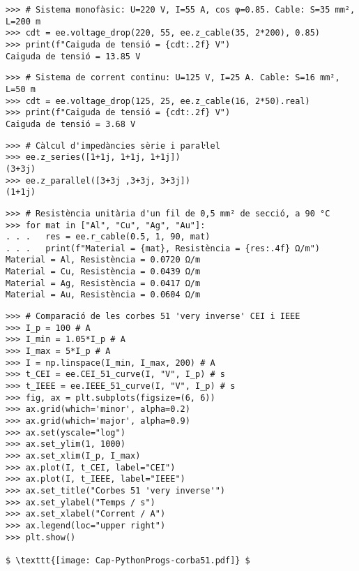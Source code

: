 \begin{lstlisting}
>>> # Sistema monofàsic: U=220 V, I=55 A, cos φ=0.85. Cable: S=35 mm², L=200 m
>>> cdt = ee.voltage_drop(220, 55, ee.z_cable(35, 2*200), 0.85)
>>> print(f"Caiguda de tensió = {cdt:.2f} V")
Caiguda de tensió = 13.85 V
\end{lstlisting}

\begin{lstlisting}
>>> # Sistema de corrent continu: U=125 V, I=25 A. Cable: S=16 mm², L=50 m
>>> cdt = ee.voltage_drop(125, 25, ee.z_cable(16, 2*50).real)
>>> print(f"Caiguda de tensió = {cdt:.2f} V")
Caiguda de tensió = 3.68 V
\end{lstlisting}

	
\begin{lstlisting}
>>> # Càlcul d'impedàncies sèrie i paraŀlel
>>> ee.z_series([1+1j, 1+1j, 1+1j])
(3+3j)
>>> ee.z_parallel([3+3j ,3+3j, 3+3j])
(1+1j)
\end{lstlisting}

\begin{lstlisting}
>>> # Resistència unitària d'un fil de 0,5 mm² de secció, a 90 °C 
>>> for mat in ["Al", "Cu", "Ag", "Au"]:
. . .   res = ee.r_cable(0.5, 1, 90, mat)
. . .   print(f"Material = {mat}, Resistència = {res:.4f} Ω/m")
Material = Al, Resistència = 0.0720 Ω/m
Material = Cu, Resistència = 0.0439 Ω/m
Material = Ag, Resistència = 0.0417 Ω/m
Material = Au, Resistència = 0.0604 Ω/m        
\end{lstlisting}

\begin{lstlisting}[mathescape=true]
>>> # Comparació de les corbes 51 'very inverse' CEI i IEEE
>>> I_p = 100 # A
>>> I_min = 1.05*I_p # A
>>> I_max = 5*I_p # A
>>> I = np.linspace(I_min, I_max, 200) # A
>>> t_CEI = ee.CEI_51_curve(I, "V", I_p) # s   
>>> t_IEEE = ee.IEEE_51_curve(I, "V", I_p) # s      
>>> fig, ax = plt.subplots(figsize=(6, 6))
>>> ax.grid(which='minor', alpha=0.2)
>>> ax.grid(which='major', alpha=0.9)
>>> ax.set(yscale="log")
>>> ax.set_ylim(1, 1000)
>>> ax.set_xlim(I_p, I_max)
>>> ax.plot(I, t_CEI, label="CEI")
>>> ax.plot(I, t_IEEE, label="IEEE")
>>> ax.set_title("Corbes 51 'very inverse'")
>>> ax.set_ylabel("Temps / s")
>>> ax.set_xlabel("Corrent / A")
>>> ax.legend(loc="upper right")
>>> plt.show()

$ \texttt{[image: Cap-PythonProgs-corba51.pdf]} $
\end{lstlisting}